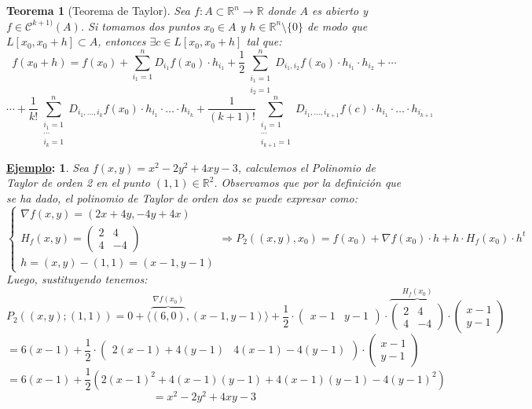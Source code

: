 \documentclass[10pt,a4paper,openright]{book}
\theoremstyle{break}
\newtheorem*{theo}{Teorema}
\newtheorem*{ej}{\underline{Ejemplo}:}
\begin{document}
\begin{theo}[Teorema de Taylor]
Sea $f: A \subset \mathbb{R}^n \to \mathbb{R}$ donde $A$ es abierto y $f\in \mathcal{C}^{k+1)} (A)$. Si tomamos dos puntos $x_0 \in A$ y $h \in \mathbb{R}^n \setminus \{0\}$ de modo que $L[x_0,x_0 + h] \subset A$, entonces $\exists c \in L[x_0, x_0 + h]$ tal que:
$$f(x_0 + h) = f(x_0) + \sum_{i_1=1}^{n} D_{i_1} f(x_0) \cdot h_{i_1} + \frac{1}{2} \sum_{\substack{i_1 = 1 \\ i_2 = 1}}^{n} D_{i_1, i_2} f(x_0) \cdot h_{i_1} \cdot h_{i_2} + \cdots$$
$$\cdots + \frac{1}{k!} \sum_{\substack{i_1 = 1 \\ \cdots \\ i_k = 1}}^{n} D_{i_1, \ldots, i_k} f(x_0) \cdot h_{i_1} \cdot \ldots \cdot h_{i_k} + \frac{1}{(k+1)!} \sum_{\substack{i_1 = 1 \\ \cdots \\ i_{k+1} = 1}}^{n} D_{i_1, \ldots, i_{k+1}} f(c) \cdot h_{i_1} \cdot \ldots \cdot h_{i_{k+1}}$$
\end{theo}

\begin{ej}
Sea $f(x,y) = x^2 - 2y^2 + 4xy - 3$, calculemos el Polinomio de Taylor de orden 2 en el punto $(1,1) \in \mathbb{R}^2$. Observamos que por la definición que se ha dado, el polinomio de Taylor de orden dos se puede expresar como:
$$\begin{cases} \nabla f(x,y) = (2x + 4y, -4y + 4x) \\ H_f (x,y) =\begin{pmatrix} 2 & 4 \\ 4 & -4 \end{pmatrix} \\ h = (x,y) - (1,1) = (x-1, y-1) \end{cases} \Rightarrow P_2\left((x,y), x_0\right) = f(x_0) + \nabla f(x_0) \cdot h + h \cdot H_f(x_0) \cdot h^t$$
Luego, sustituyendo tenemos:
$$P_2((x,y); (1,1)) = 0 + \langle \overbrace{(6,0)}^{\nabla f(x_0)},(x-1, y-1) \rangle + \frac{1}{2} \cdot \begin{pmatrix}
x-1 & y-1
\end{pmatrix} \cdot \overbrace{\begin{pmatrix}
2 & 4 \\ 4 & -4
\end{pmatrix}}^{H_f(x_0)} \cdot \begin{pmatrix}
x-1 \\ y-1
\end{pmatrix} $$
$$= 6(x-1) + \frac{1}{2} \cdot \begin{pmatrix}
2(x-1) + 4 (y-1) & 4(x-1) - 4 (y-1)
\end{pmatrix}\cdot \begin{pmatrix}
x-1 \\ y-1
\end{pmatrix} $$
$$= 6(x-1) + \frac{1}{2} \left( 2 (x-1)^2 + 4 (x-1)(y-1) + 4 (x-1)(y-1) - 4 (y-1)^2 \right)$$
$$= x^2 - 2y^2 + 4xy - 3$$
\end{ej}
\end{document}
